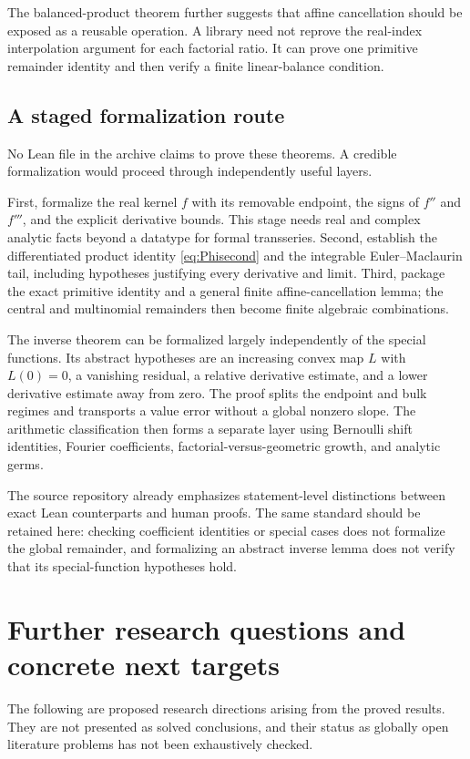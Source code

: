\documentclass[11pt,a4paper]{article}
\numberwithin{equation}{section}
\theoremstyle{definition}
\begin{document}
The balanced-product theorem further suggests that affine cancellation should be exposed as a reusable operation. A library need not reprove the real-index interpolation argument for each factorial ratio. It can prove one primitive remainder identity and then verify a finite linear-balance condition.

\subsection{A staged formalization route}
No Lean file in the archive claims to prove these theorems. A credible formalization would proceed through independently useful layers.

First, formalize the real kernel $f$ with its removable endpoint, the signs of $f''$ and $f'''$, and the explicit derivative bounds. This stage needs real and complex analytic facts beyond a datatype for formal transseries. Second, establish the differentiated product identity \eqref{eq:Phisecond} and the integrable Euler--Maclaurin tail, including hypotheses justifying every derivative and limit. Third, package the exact primitive identity and a general finite affine-cancellation lemma; the central and multinomial remainders then become finite algebraic combinations.

The inverse theorem can be formalized largely independently of the special functions. Its abstract hypotheses are an increasing convex map $L$ with $L(0)=0$, a vanishing residual, a relative derivative estimate, and a lower derivative estimate away from zero. The proof splits the endpoint and bulk regimes and transports a value error without a global nonzero slope. The arithmetic classification then forms a separate layer using Bernoulli shift identities, Fourier coefficients, factorial-versus-geometric growth, and analytic germs.

The source repository already emphasizes statement-level distinctions between exact Lean counterparts and human proofs. The same standard should be retained here: checking coefficient identities or special cases does not formalize the global remainder, and formalizing an abstract inverse lemma does not verify that its special-function hypotheses hold.

\section{Further research questions and concrete next targets}
\label{sec:questions}

The following are proposed research directions arising from the proved results. They are not presented as solved conclusions, and their status as globally open literature problems has not been exhaustively checked.
\end{document}
